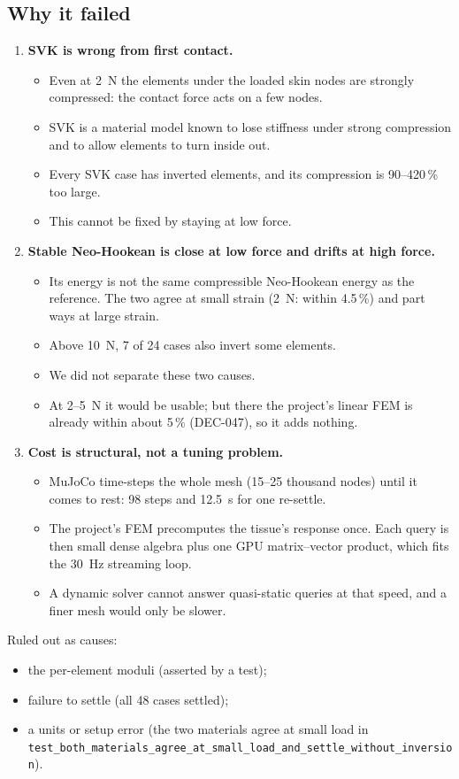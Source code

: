 \documentclass[11pt,a4paper]{article}
\newcommand{\src}[1]{\texttt{\small #1}}
\newcommand{\dec}[1]{\textsf{#1}}
\begin{document}
\subsection{Why it failed}
\begin{enumerate}
  \item \textbf{SVK is wrong from first contact.}
    \begin{itemize}
      \item Even at 2~N the elements under the loaded skin nodes are strongly compressed: the contact force acts on
        a few nodes.
      \item SVK is a material model known to lose stiffness under strong compression and to allow elements to turn
        inside out.
      \item Every SVK case has inverted elements, and its compression is 90--420\,\% too large.
      \item This cannot be fixed by staying at low force.
    \end{itemize}
  \item \textbf{Stable Neo-Hookean is close at low force and drifts at high force.}
    \begin{itemize}
      \item Its energy is not the same compressible Neo-Hookean energy as the reference. The two agree at small
        strain (2~N: within 4.5\,\%) and part ways at large strain.
      \item Above 10~N, 7 of 24 cases also invert some elements.
      \item We did not separate these two causes.
      \item At 2--5~N it would be usable; but there the project's linear FEM is already within about 5\,\%
        (\dec{DEC-047}), so it adds nothing.
    \end{itemize}
  \item \textbf{Cost is structural, not a tuning problem.}
    \begin{itemize}
      \item MuJoCo time-steps the whole mesh (15--25 thousand nodes) until it comes to rest: 98 steps and 12.5~s for
        one re-settle.
      \item The project's FEM precomputes the tissue's response once. Each query is then small dense algebra plus
        one GPU matrix--vector product, which fits the 30~Hz streaming loop.
      \item A dynamic solver cannot answer quasi-static queries at that speed, and a finer mesh would only be
        slower.
    \end{itemize}
\end{enumerate}
\noindent Ruled out as causes:
\begin{itemize}
  \item the per-element moduli (asserted by a test);
  \item failure to settle (all 48 cases settled);
  \item a units or setup error (the two materials agree at small load in
    \src{test\_both\_materials\_agree\_at\_small\_load\_and\_settle\_without\_inversion}).
\end{itemize}
\end{document}
